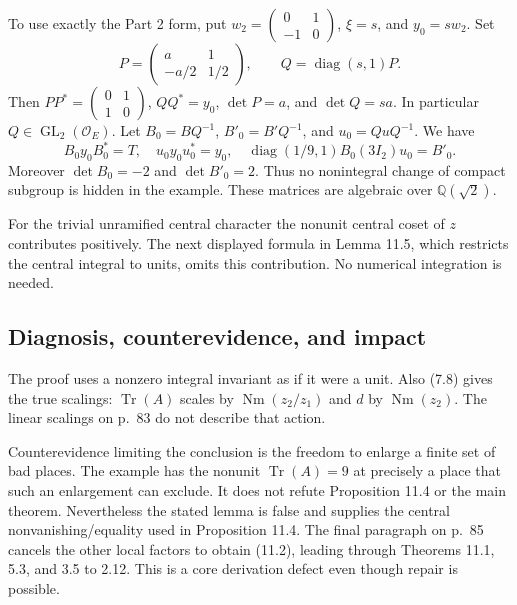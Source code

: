 \documentclass[10pt]{article}
\begin{document}
To use exactly the Part 2 form, put \(w_2=\left(\begin{smallmatrix}0&1\\-1&0\end{smallmatrix}\right)\), \(\xi=s\), and \(y_0=sw_2\). Set \[P=\begin{pmatrix}a&1\\-a/2&1/2\end{pmatrix},\qquad Q=\operatorname{diag}(s,1)P.\] Then \(PP^*=\left(\begin{smallmatrix}0&1\\1&0\end{smallmatrix}\right)\), \(QQ^*=y_0\), \(\det P=a\), and \(\det Q=sa\). In particular \(Q\in\operatorname{GL}_2(\mathcal O_E)\). Let \(B_0=BQ^{-1}\), \(B'_0=B'Q^{-1}\), and \(u_0=QuQ^{-1}\). We have \[B_0y_0B_0^*=T,\quad u_0y_0u_0^*=y_0,\quad
 \operatorname{diag}(1/9,1)B_0(3I_2)u_0=B'_0.\] Moreover \(\det B_0=-2\) and \(\det B'_0=2\). Thus no nonintegral change of compact subgroup is hidden in the example. These matrices are algebraic over \(\mathbb Q(\sqrt2)\).\par
For the trivial unramified central character the nonunit central coset of \(z\) contributes positively. The next displayed formula in Lemma 11.5, which restricts the central integral to units, omits this contribution. No numerical integration is needed.\par
\subsection*{Diagnosis, counterevidence, and impact}
The proof uses a nonzero integral invariant as if it were a unit. Also (7.8) gives the true scalings: \(\operatorname{Tr}(A)\) scales by \(\operatorname{Nm}(z_2/z_1)\) and \(d\) by \(\operatorname{Nm}(z_2)\). The linear scalings on p. 83 do not describe that action.\par
Counterevidence limiting the conclusion is the freedom to enlarge a finite set of bad places. The example has the nonunit \(\operatorname{Tr}(A)=9\) at precisely a place that such an enlargement can exclude. It does not refute Proposition 11.4 or the main theorem. Nevertheless the stated lemma is false and supplies the central nonvanishing/equality used in Proposition 11.4. The final paragraph on p. 85 cancels the other local factors to obtain (11.2), leading through Theorems 11.1, 5.3, and 3.5 to 2.12. This is a core derivation defect even though repair is possible.\par
\end{document}
